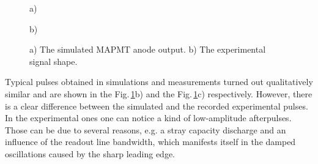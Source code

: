 \documentclass{webofc}
\begin{document}
\begin{figure}[h]
	\begin{minipage}[h]{0.47\linewidth}
		 a) \\
	\end{minipage}
	\hfill
	\begin{minipage}[h]{0.47\linewidth}
		 b) \\
	\end{minipage}
	\caption{ a) The simulated MAPMT anode output. b) The experimental signal shape.}
	\label{ris:sim}
\end{figure}
Typical pulses obtained in simulations and measurements turned out qualitatively similar and are shown in the Fig.\,\ref{ris:sim}b) and the Fig.\,\ref{ris:sim}c) respectively. However, there is a clear difference between the simulated and the recorded experimental pulses. In the experimental ones one can notice a kind of low-amplitude afterpulses. Those can be due to several reasons, e.g. a stray capacity discharge and an influence of the readout line bandwidth, which manifests itself in the damped oscillations caused by the sharp leading edge.
\end{document}
